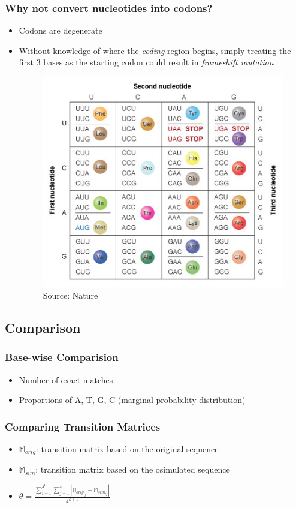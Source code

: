 \documentclass[xcolor=dvipsnames]{beamer} \usepackage{beamerthemesplit}
\begin{document}
\begin{frame}
	\frametitle{Why not convert nucleotides into codons?}
    \begin{itemize}
    	\item Codons are degenerate
        \item Without knowledge of where the \emph{coding} region begins, simply treating the first 3 bases as the starting codon could result in \emph{frameshift mutation}
        \begin{figure}
        \centering
        \includegraphics[scale=0.38]{EssGen1-5_genetic_code_0.jpg}
        \tiny{Source: Nature}
        \end{figure}
    \end{itemize}
\end{frame}

\subsection{Comparison}
\begin{frame}
	\frametitle{Base-wise Comparision}
	\begin{itemize}
		\item Number of exact matches
		\item Proportions of A, T, G, C (marginal probability distribution)
	\end{itemize}
\end{frame}

\begin{frame}
	\frametitle{Comparing Transition Matrices}
	\begin{itemize}
		\item $\mathbb{M}_{orig}$: transition matrix based on the original sequence
		\item $\mathbb{M}_{sim}$: transition matrix based on the osimulated sequence
		\item $\theta = \displaystyle{ \frac{ \sum_{i=1}^{4^k} \sum_{j=1}^{4} {|\mathbb{M}_{orig_{ij}}-\mathbb{M}_{sim_{ij}}|} }{4^{k+1}} }$
	\end{itemize}
\end{frame}
\end{document}
